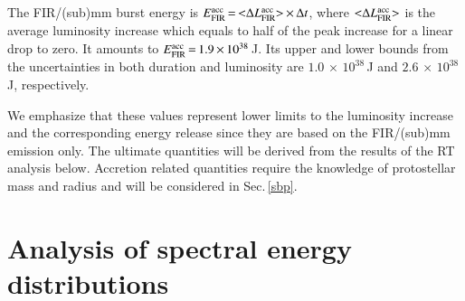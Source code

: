 The FIR/(sub)mm burst energy is $E^{\rm acc}_{\rm FIR}\,{=}\,{<}\Delta L^{\rm acc}_{\rm FIR}{>}\,{\times}\,\Delta t$, where ${<}\Delta L^{\rm acc}_{\rm FIR}{>}$ is the average luminosity increase which equals to half of the peak increase for a linear drop to zero.  It amounts to $E^{\rm acc}_{\rm FIR}\,{=}\,1.9\,{\times}\,10^{38}$\,J. Its upper and lower bounds from the uncertainties in both duration and luminosity are $1.0\,{\times}\,10^{38}$\,J and $2.6\,{\times}\,10^{38}$\,J, respectively. 





We emphasize that these values represent lower limits to the  luminosity increase and the corresponding energy release since they are based on the FIR/(sub)mm emission only. The ultimate quantities will be derived from the results of the RT analysis below.
Accretion related quantities require the knowledge of protostellar mass and radius and will be considered in Sec.\,\ref{sbp}.

\section{Analysis of spectral energy distributions}\label{ased}





